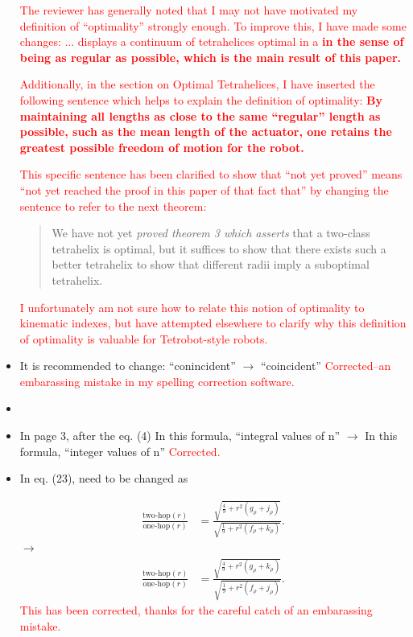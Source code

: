 \documentclass{article}
\newcommand{\highlighttext}[1] {\textcolor{red}{#1}}
\begin{document}
\begin{itemize}
\highlighttext{
  The reviewer has generally noted that I may not have motivated my definition of ``optimality''
  strongly enough. To improve this, I have made some changes:
... displays a continuum of tetrahelices optimal in a \bf{
  in the sense of being
as regular as possible},
which is the main result of this
paper.
}

\highlighttext{
  Additionally, in the section on Optimal Tetrahelices, I have inserted the following sentence which helps to
  explain the definition of optimality:
  \bf{By maintaining all lengths as close to the same ``regular'' length as possible,
such as the mean length of the actuator,
one retains the greatest possible freedom of motion for the robot.}
  }

\highlighttext{This specific sentence has been clarified to show that ``not yet proved'' means
  ``not yet reached the proof in this paper of that fact that'' by changing the sentence to refer
  to the next theorem:
  \begin{quote}
  We have not yet {\em
proved theorem 3 which asserts} that a two-class tetrahelix is optimal, but it suffices to show that there
exists such a better tetrahelix to show that different radii imply a suboptimal
tetrahelix.
  \end{quote}
  I unfortunately am not sure how to relate this notion of optimality to kinematic indexes, but
  have attempted elsewhere to clarify why this definition of optimality is valuable for
  Tetrobot-style robots.
  }
\item 
 It is recommended to change:
 ``conincident'' $\rightarrow$ ``coincident''
 \highlighttext{Corrected--an embarassing mistake in my spelling correction software.}
 \item
\item In page 3, after the eq. (4)
  In this formula, ``integral values of n'' $\rightarrow$ In this formula, ``integer values of n''
  \highlighttext{Corrected.}
  \item 
In eq. (23), need to be changed as

\begin{equation}
  \begin{split}
  \frac{\text{two-hop}(r)}{ \text{one-hop}(r)}  &=
  \frac{\sqrt{\frac{4}{9}  + r^2(g_{\rho}+ j_{\rho})}}
       {\sqrt{\frac{1}{9} +r^2(f_{\rho}+k_{\rho}) }} \text{.}
  \end{split}       
\end{equation}
$\rightarrow$ 
\begin{equation}
  \begin{split}
  \frac{\text{two-hop}(r)}{ \text{one-hop}(r)}  &=
  \frac{\sqrt{\frac{4}{9}  + r^2(g_{\rho}+ k_{\rho})}}
       {\sqrt{\frac{1}{9} +r^2(f_{\rho}+j_{\rho}) }} \text{.}
  \end{split}       
\end{equation}
\highlighttext{This has been corrected, thanks for the careful catch of an embarassing mistake.}


\end{itemize}
\end{document}
